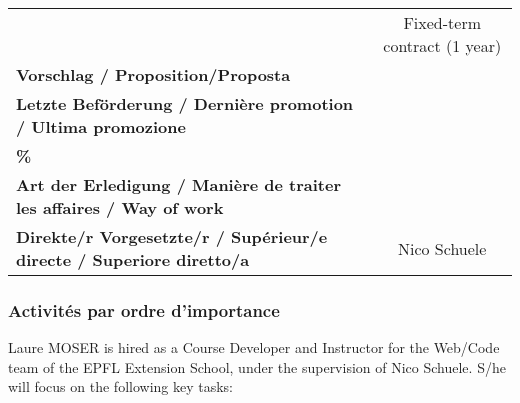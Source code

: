 \documentclass[
]{article}
\begin{document}
\begin{longtable}[]{@{}lc@{}}
\begin{minipage}[t]{0.44\columnwidth}
\end{minipage} & \begin{minipage}[t]{0.50\columnwidth}\centering
Fixed-term contract (1 year)\strut
\end{minipage}\tabularnewline
\begin{minipage}[t]{0.44\columnwidth}\raggedright
\textbf{Vorschlag / Proposition/Proposta}\strut
\end{minipage} & \begin{minipage}[t]{0.50\columnwidth}\centering
\strut
\end{minipage}\tabularnewline
\begin{minipage}[t]{0.44\columnwidth}\raggedright
\textbf{Letzte Beförderung / Dernière promotion / Ultima
promozione}\strut
\end{minipage} & \begin{minipage}[t]{0.50\columnwidth}\centering
\strut
\end{minipage}\tabularnewline
\begin{minipage}[t]{0.44\columnwidth}\raggedright
\textbf{\%}\strut
\end{minipage} & \begin{minipage}[t]{0.50\columnwidth}\centering
\strut
\end{minipage}\tabularnewline
\begin{minipage}[t]{0.44\columnwidth}\raggedright
\textbf{Art der Erledigung / Manière de traiter les affaires / Way of
work}\strut
\end{minipage} & \begin{minipage}[t]{0.50\columnwidth}\centering
\strut
\end{minipage}\tabularnewline
\begin{minipage}[t]{0.44\columnwidth}\raggedright
\textbf{Direkte/r Vorgesetzte/r / Supérieur/e directe / Superiore
diretto/a}\strut
\end{minipage} & \begin{minipage}[t]{0.50\columnwidth}\centering
Nico Schuele\strut
\end{minipage}\tabularnewline
\bottomrule
\end{longtable}

\hypertarget{activituxe9s-par-ordre-dimportance}{%
\subsubsection{Activités par ordre
d'importance}\label{activituxe9s-par-ordre-dimportance}}

Laure MOSER is hired as a Course Developer and Instructor for the
Web/Code team of the EPFL Extension School, under the supervision of
Nico Schuele. S/he will focus on the following key tasks:
\end{document}
